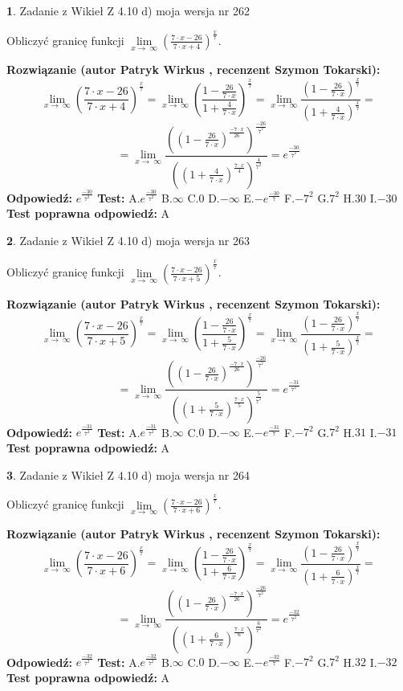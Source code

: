 \documentclass[12pt, a4paper]{article}
\theoremstyle{definition} %
\newtheorem{zad}{}
\newcommand{\zadStart}[1]{\begin{zad}#1\newline}
\newcommand{\zadStop}{\end{zad}}
\newcommand{\rozwStart}[2]{\noindent \textbf{Rozwiązanie (autor #1 , recenzent #2): }\newline}
\newcommand{\rozwStop}{\newline}
\newcommand{\odpStart}{\noindent \textbf{Odpowiedź:}\newline}
\newcommand{\odpStop}{\newline}
\newcommand{\testStart}{\noindent \textbf{Test:}\newline}
\newcommand{\testStop}{\newline}
\newcommand{\kluczStart}{\noindent \textbf{Test poprawna odpowiedź:}\newline}
\newcommand{\kluczStop}{\newline}
\begin{document}
\zadStart{Zadanie z Wikieł Z 4.10 d) moja wersja nr 262}


Obliczyć granicę funkcji  $\lim\limits_{x\to\ \infty}(\frac{7\cdot x-26}{7\cdot x+4})^{\frac{x}{7}}$.
\zadStop
\rozwStart{Patryk Wirkus}{Szymon Tokarski}
$$\lim\limits_{x\to\ \infty}(\frac{7\cdot x-26}{7\cdot x+4})^{\frac{x}{7}} = \lim\limits_{x\to\ \infty}(\frac{1-\frac{26}{7\cdot x}}{1+\frac{4}{7\cdot x}})^{\frac{x}{7}}=\lim\limits_{x\to\ \infty}\frac{(1-\frac{26}{7\cdot x})^{\frac{x}{7}}}{(1+\frac{4}{7\cdot x})^{\frac{x}{7}}}=$$
$$=\lim\limits_{x\to\ \infty}\frac{((1-\frac{26}{7\cdot x})^{\frac{-7\cdot x}{26}})^{\frac{-26}{7^{2}}}}{((1+\frac{4}{7\cdot x})^{\frac{7\cdot x}{4}})^{\frac{4}{7^{2}}}}=e^{\frac{-30}{7^{2}}}$$
\rozwStop
\odpStart
$e^{\frac{-30}{7^{2}}}$
\odpStop
\testStart
A.$e^{\frac{-30}{7^{2}}}$ B.$\infty$ C.$0$ D.$-\infty$ E.$-e^{\frac{-30}{7}}$
F.$-7^{2}$ G.$7^{2}$
H.$30$
I.$-30$
\testStop
\kluczStart
A
\kluczStop



\zadStart{Zadanie z Wikieł Z 4.10 d) moja wersja nr 263}


Obliczyć granicę funkcji  $\lim\limits_{x\to\ \infty}(\frac{7\cdot x-26}{7\cdot x+5})^{\frac{x}{7}}$.
\zadStop
\rozwStart{Patryk Wirkus}{Szymon Tokarski}
$$\lim\limits_{x\to\ \infty}(\frac{7\cdot x-26}{7\cdot x+5})^{\frac{x}{7}} = \lim\limits_{x\to\ \infty}(\frac{1-\frac{26}{7\cdot x}}{1+\frac{5}{7\cdot x}})^{\frac{x}{7}}=\lim\limits_{x\to\ \infty}\frac{(1-\frac{26}{7\cdot x})^{\frac{x}{7}}}{(1+\frac{5}{7\cdot x})^{\frac{x}{7}}}=$$
$$=\lim\limits_{x\to\ \infty}\frac{((1-\frac{26}{7\cdot x})^{\frac{-7\cdot x}{26}})^{\frac{-26}{7^{2}}}}{((1+\frac{5}{7\cdot x})^{\frac{7\cdot x}{5}})^{\frac{5}{7^{2}}}}=e^{\frac{-31}{7^{2}}}$$
\rozwStop
\odpStart
$e^{\frac{-31}{7^{2}}}$
\odpStop
\testStart
A.$e^{\frac{-31}{7^{2}}}$ B.$\infty$ C.$0$ D.$-\infty$ E.$-e^{\frac{-31}{7}}$
F.$-7^{2}$ G.$7^{2}$
H.$31$
I.$-31$
\testStop
\kluczStart
A
\kluczStop



\zadStart{Zadanie z Wikieł Z 4.10 d) moja wersja nr 264}


Obliczyć granicę funkcji  $\lim\limits_{x\to\ \infty}(\frac{7\cdot x-26}{7\cdot x+6})^{\frac{x}{7}}$.
\zadStop
\rozwStart{Patryk Wirkus}{Szymon Tokarski}
$$\lim\limits_{x\to\ \infty}(\frac{7\cdot x-26}{7\cdot x+6})^{\frac{x}{7}} = \lim\limits_{x\to\ \infty}(\frac{1-\frac{26}{7\cdot x}}{1+\frac{6}{7\cdot x}})^{\frac{x}{7}}=\lim\limits_{x\to\ \infty}\frac{(1-\frac{26}{7\cdot x})^{\frac{x}{7}}}{(1+\frac{6}{7\cdot x})^{\frac{x}{7}}}=$$
$$=\lim\limits_{x\to\ \infty}\frac{((1-\frac{26}{7\cdot x})^{\frac{-7\cdot x}{26}})^{\frac{-26}{7^{2}}}}{((1+\frac{6}{7\cdot x})^{\frac{7\cdot x}{6}})^{\frac{6}{7^{2}}}}=e^{\frac{-32}{7^{2}}}$$
\rozwStop
\odpStart
$e^{\frac{-32}{7^{2}}}$
\odpStop
\testStart
A.$e^{\frac{-32}{7^{2}}}$ B.$\infty$ C.$0$ D.$-\infty$ E.$-e^{\frac{-32}{7}}$
F.$-7^{2}$ G.$7^{2}$
H.$32$
I.$-32$
\testStop
\kluczStart
A
\kluczStop
\end{document}
